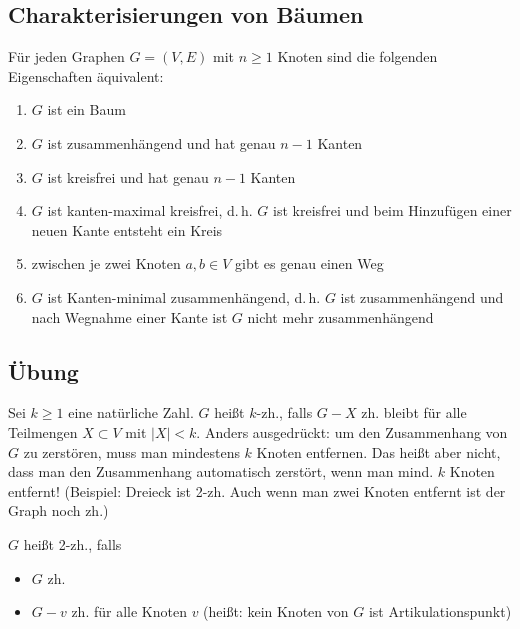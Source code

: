 \documentclass[%
a4paper, %
9pt,              %
leqno,            %
fleqn,            %
]
{scrartcl}
\begin{document}
\subsection*{Charakterisierungen von Bäumen} %
\label{sub:Charakterisierungen von Bäumen}

Für jeden Graphen $G = (V,E)$ mit $n \geq 1$ Knoten sind die folgenden
Eigenschaften äquivalent:
\begin{enumerate}
  \item $G$ ist ein Baum
  \item $G$ ist zusammenhängend und hat genau $n-1$ Kanten
  \item $G$ ist kreisfrei und hat genau $n-1$ Kanten
  \item $G$ ist kanten-maximal kreisfrei, d.\,h. $G$ ist kreisfrei und beim
    Hinzufügen einer neuen Kante entsteht ein Kreis
  \item zwischen je zwei Knoten $a,b \in V$ gibt es genau einen Weg
  \item $G$ ist Kanten-minimal zusammenhängend, d.\,h. $G$ ist zusammenhängend
    und nach Wegnahme einer Kante ist $G$ nicht mehr zusammenhängend
\end{enumerate}



\newpage


\subsection*{Übung} %
\label{sub:Übung}

Sei $k \geq 1$ eine natürliche Zahl. $G$ heißt $k$-zh., falls $G-X$ zh. bleibt
für alle Teilmengen $X \subset V$ mit $|X| < k$. Anders ausgedrückt: um den
Zusammenhang von $G$ zu zerstören, muss man mindestens $k$ Knoten entfernen. Das
heißt aber nicht, dass man den Zusammenhang automatisch zerstört, wenn man mind.
$k$ Knoten entfernt! (Beispiel: Dreieck ist 2-zh. Auch wenn man zwei Knoten
entfernt ist der Graph noch zh.)\medskip

$G$ heißt 2-zh., falls
\begin{itemize}
  \item $G$ zh.
  \item $G - v$ zh. für alle Knoten $v$ (heißt: kein Knoten von $G$ ist
    Artikulationspunkt)
\end{itemize}
\end{document}
